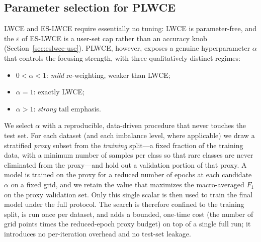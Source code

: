 \documentclass[a4paper,fleqn]{cas-sc}
\begin{document}
\subsection{Parameter selection for PLWCE}\label{sec:plwce-selection}
LWCE and ES-LWCE require essentially no tuning: LWCE is parameter-free, and the
$\varepsilon$ of ES-LWCE is a user-set cap rather than an accuracy knob
(Section~\ref{sec:eslwce-use}). PLWCE, however, exposes a genuine hyperparameter
$\alpha$ that controls the focusing strength, with three qualitatively distinct
regimes:
\begin{itemize}
\item $0 < \alpha < 1$: \emph{mild} re-weighting, weaker than LWCE;
\item $\alpha = 1$: exactly LWCE;
\item $\alpha > 1$: \emph{strong} tail emphasis.
\end{itemize}
We select $\alpha$ with a reproducible, data-driven procedure that never touches
the test set. For each dataset (and each imbalance level, where applicable) we
draw a stratified \emph{proxy} subset from the \emph{training} split---a fixed
fraction of the training data, with a minimum number of samples per class so that
rare classes are never eliminated from the proxy---and hold out a validation
portion of that proxy. A model is trained on the proxy for a reduced number of
epochs at each candidate $\alpha$ on a fixed grid, and we retain the value that
maximizes the macro-averaged $F_1$ on the proxy validation set. Only this single
scalar is then used to train the final model under the full protocol. The search
is therefore confined to the training split, is run once per dataset, and adds a
bounded, one-time cost (the number of grid points times the reduced-epoch proxy
budget) on top of a single full run; it introduces no per-iteration overhead and
no test-set leakage.
\end{document}
